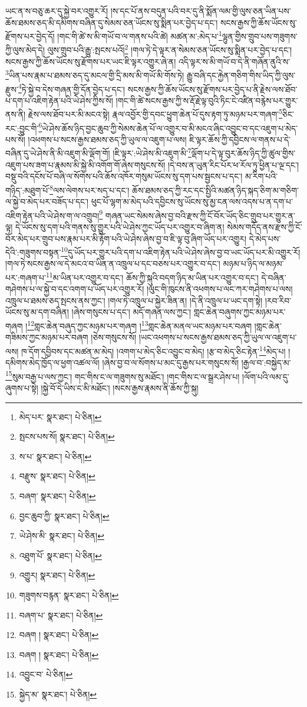 ཡང་ན་ས་བཅུ་ཆར་དུ་སྐྱེ་བར་འགྱུར་རོ། །ས་དང་པོ་ནས་བདུན་པའི་བར་དུ་ནི་སྨོན་ལམ་གྱི་ལུས་ཅན་ཡིན་པས་ཆོས་ཐམས་ཅད་མི་དམིགས་བཞིན་དུ་སེམས་ཅན་ཡོངས་སུ་སྨིན་པར་བྱེད་པ་དང་། སངས་རྒྱས་ཀྱི་ཆོས་ཡོངས་སུ་རྫོགས་པར་བྱེད་དོ། །གང་གི་ཚེ་ས་མི་གཡོ་བ་ལ་གནས་པའི་ཚེ། མཚན་མ་:མེད་པ་\footnote{མེད་པར་  སྣར་ཐང་།  པེ་ཅིན། }ལྷུན་གྱིས་གྲུབ་པས་གཟུགས་ཀྱི་ལུས་མེད་དེ། ལུས་གྲུབ་པའི་རྒྱུ་:སྤངས་པའོ།\footnote{སྤངས་པས་སོ།  སྣར་ཐང་།  པེ་ཅིན། } །གལ་ཏེ་དེ་ལྟར་ན་སེམས་ཅན་ཡོངས་སུ་སྨིན་པར་བྱེད་པ་དང་། སངས་རྒྱས་ཀྱི་ཆོས་ཡོངས་སུ་རྫོགས་པར་ཡང་ཇི་ལྟར་འགྱུར་ཞེ་ན། འདི་ལྟར་ས་མི་གཡོ་བ་དེ་ནི་གཞོན་ནུའི་ས་\footnote{ས་པ་  སྣར་ཐང་།  པེ་ཅིན། }ཡིན་པས་རྣམ་པ་ཐམས་ཅད་དུ་མངལ་གྱི་དྲི་མས་མི་གཡོ་མི་གོས་ཏེ། རྒྱུ་བཞི་དང་རྐྱེན་གཅིག་གིས་ཡིད་ཀྱི་ལུས་རྫུས་\footnote{བརྫུས་  སྣར་ཐང་།  པེ་ཅིན། }ཏེ་སྐྱེ་བ་དེས་གཞན་གྱི་དོན་བྱེད་པ་དང་། སངས་རྒྱས་ཀྱི་ཆོས་ཡོངས་སུ་རྫོགས་པར་བྱེད་པ་ནི་རྗེས་ལས་ཐོབ་པ་དག་པ་འཇིག་རྟེན་པའི་ཡེ་ཤེས་ཀྱིས་སོ། །གང་གི་ཚེ་སངས་རྒྱས་ཀྱི་ས་རྡོ་རྗེ་ལྟ་བུའི་ཏིང་ངེ་འཛིན་བརྙེས་པར་གྱུར་ནས་ནི། རྗེས་ལས་ཐོབ་པར་མི་མངའ་སྟེ། རྣལ་འབྱོར་གྱི་དབང་ཕྱུག་ཆེན་པོ་དུས་རྟག་ཏུ་མཉམ་པར་གཞག་\footnote{བཞག་  སྣར་ཐང་།  པེ་ཅིན། }ཅིང་རང་:བྱུང་གི་\footnote{བྱང་ཆུབ་ཀྱི་  སྣར་ཐང་།  པེ་ཅིན། }ཡེ་ཤེས་ཆོས་ཉིད་བྱང་ཆུབ་ཀྱི་སེམས་ཆེན་པོ་ལ་འགྱུར་བ་མི་མངའ་ཞིང་འབྱུང་བ་དང་འཇུག་པ་མེད་པས་སོ། །འཕགས་པ་སངས་རྒྱས་ཐམས་ཅད་ཀྱི་ཡུལ་ལ་འཇུག་པ་ལས། ཇི་ལྟར་ཆོས་ཀྱི་དབྱིངས་ལ་གནས་པ་དེ་བཞིན་དུ་ཡེ་ཤེས་ནི་མི་འཇུག་མི་ལྡོག་གོ། །ཇི་ལྟར་:ཡེ་ཤེས་མི་འཇུག་མི་\footnote{ཡེ་ཤེས་མི་  སྣར་ཐང་།  པེ་ཅིན། }ལྡོག་པ་དེ་ལྟ་བུར་ཆོས་ཉིད་ཀྱི་ཚུལ་གྱིས་འཇུག་པས་ཟག་པ་རྣམས་མི་སྐྱེ་མི་འགོག་གོ་ཞེས་གསུངས་སོ། །དེ་བས་ན་ཡུན་རིང་པོར་ཕ་རོལ་ཏུ་ཕྱིན་པ་ལྔ་དང་། བསྡུ་བའི་དངོས་པོ་བཞི་ལ་སོགས་པའི་ཆོས་འཁོར་གསུམ་ཡོངས་སུ་དག་པས་སྦྱངས་པ་དང་། མ་རིག་པའི་གཉིད་:མཐུག་པོ་\footnote{འཐུག་པོ་  སྣར་ཐང་།  པེ་ཅིན། }ལས་ལེགས་པར་སད་པ་དང་། ཆོས་ཐམས་ཅད་ཀྱི་རང་དང་སྤྱིའི་མཚན་ཉིད་སྐད་ཅིག་མ་གཅིག་ལ་སྐྱེ་བ་མེད་པར་བཟོད་པ་དང་། ཕུང་པོ་ལྷག་མ་མེད་པའི་དབྱིངས་སུ་ཡོངས་སུ་མྱ་ངན་ལས་འདས་པ་ན་དག་པ་འཇིག་རྟེན་པའི་ཡེ་ཤེས་ག་ལ་འགྲུབ།\footnote{འགྱུར།  སྣར་ཐང་།  པེ་ཅིན། } གཞན་ཡང་སེམས་ཞེས་བྱ་བའི་རྫས་ཀྱི་ངོ་བོར་ཡོད་ཅིང་གྲུབ་པར་གྱུར་ན་ལྟ། དེ་ཡོངས་སུ་དག་པའི་གནས་སུ་གྱུར་པའི་ཡེ་ཤེས་ཀྱང་ཡོད་པར་འགྱུར་བ་ཞིག་ན། སེམས་གདོད་ནས་རྫས་ཀྱི་ངོ་བོར་མེད་པར་གྲུབ་པས་རྣམ་པར་མི་རྟོག་པའི་ཡེ་ཤེས་ཞེས་བྱ་བ་ཇི་ལྟ་བུ་ཞིག་ཡོད་པར་འགྱུར། དེ་མེད་པས་དེའི་:གཟུགས་བསྟན་\footnote{གཟུགས་བརྙན་  སྣར་ཐང་།  པེ་ཅིན། }དུ་ཡོད་པར་གྱུར་པའི་དག་པ་འཇིག་རྟེན་པའི་ཡེ་ཤེས་ཞེས་བྱ་བ་ཡང་ཡོད་པར་མི་འགྱུར་རོ། །གལ་ཏེ་སངས་རྒྱས་ལ་དེ་མངའ་བ་ཡིན་ན་འཁྲུལ་པ་དང་བཅས་པར་འགྱུར་བ་དང་། མཉམ་པ་ཉིད་ལ་མཉམ་པར་:གཞག་པ་\footnote{བཞག་པ་  སྣར་ཐང་།  པེ་ཅིན། }མ་ཡིན་པར་འགྱུར་བ་དང་། ཆོས་ཀྱི་སྐུའི་བདག་ཉིད་མ་ཡིན་པར་འགྱུར་བ་དང་། དེ་བཞིན་གཤེགས་པ་ལ་སྐྱེ་བ་དང་འགག་པ་ཡོད་པར་འགྱུར་རོ། །ལུང་གི་ཁུངས་ནི་འཕགས་པ་ལང་ཀར་གཤེགས་པ་ལས། འཁྲུལ་པ་ཐམས་ཅད་སྤངས་ནས་ཀྱང་། །གལ་ཏེ་འཁྲུལ་པ་སྐྱེར་ཟིན་ན། །དེ་ནི་འཁྲུལ་པ་ཡང་དག་སྟེ། །རབ་རིབ་ཡོངས་སུ་མ་དག་བཞིན། །ཞེས་གསུངས་པ་དང་། མདོ་གཞན་ལས་ཀྱང་། གླང་ཆེན་བཞུགས་ཀྱང་མཉམ་པར་གཞག །\footnote{བཞག །  སྣར་ཐང་།  པེ་ཅིན། }གླང་ཆེན་བཞུད་ཀྱང་མཉམ་པར་གཞག །\footnote{བཞག །  སྣར་ཐང་།  པེ་ཅིན། }གླང་ཆེན་མནལ་ཡང་མཉམ་པར་བཞག །གླང་ཆེན་གཟིམས་ཀྱང་མཉམ་པར་བཞག །ཅེས་གསུངས་སོ། །ཡང་འཕགས་པ་སངས་རྒྱས་ཐམས་ཅད་ཀྱི་ཡུལ་ལ་འཇུག་པ་ལས། ཁ་དོག་དབྱིབས་དང་མཚན་མ་མེད། །འགག་པ་མེད་ཅིང་འབྱུང་བ་མེད། །རྩ་བ་མེད་ཅིང་རྟེན་\footnote{འབྱུང་བ་  པེ་ཅིན། }མེད་པ། །དམིགས་མེད་ཁྱོད་ལ་ཕྱག་འཚལ་ལོ། །ཞེས་བྱ་བ་ལ་སོགས་པ་མང་དུ་རྒྱས་པར་གསུངས་སོ། །རྒྱལ་བ་:བསྐྱེད་མ་\footnote{སྐྱེད་མ་  སྣར་ཐང་།  པེ་ཅིན། }སུམ་བརྒྱ་པ་ལས་ཀྱང་། གང་གིས་ང་ལ་གཟུགས་སུ་མཐོང་། །གང་གིས་ང་ལ་སྒྲར་ཤེས་པ། །ལོག་པའི་ལམ་དུ་ཞུགས་པ་སྟེ། །སྐྱེ་བོ་དེ་ཡིས་ང་མི་མཐོང་། །སངས་རྒྱས་རྣམས་ནི་ཆོས་ཀྱི་སྐུ། 